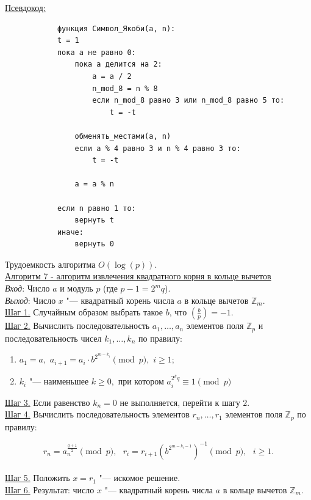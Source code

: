 \documentclass[bachelor, och, labwork]{shiza}
\begin{document}
            \underline{Псевдокод:}
            \begin{verbatim}
            функция Символ_Якоби(a, n):
            t = 1
            пока a не равно 0:
                пока a делится на 2:
                    a = a / 2
                    n_mod_8 = n % 8
                    если n_mod_8 равно 3 или n_mod_8 равно 5 то:
                        t = -t
        
                обменять_местами(a, n)
                если a % 4 равно 3 и n % 4 равно 3 то:
                    t = -t
        
                a = a % n
        
            если n равно 1 то:
                вернуть t
            иначе:
                вернуть 0
            \end{verbatim}


            Трудоемкость алгоритма $O(\log(p))$.\\

        \underline{Алгоритм 7 - алгоритм извлечения квадратного корня в кольце вычетов}\\
            \textit{Вход}: Число $a$ и модуль $p$ (где $p - 1 = 2^m q$).\\
            \textit{Выход}: Число $x$ "--- квадратный корень числа $a$ в кольце
            вычетов $\mathbb{Z}_m$.\\
            \underline{Шаг 1.} Случайным образом выбрать такое $b$, что
            $\left(\frac{b}{p}\right) = -1$.\\
            \underline{Шаг 2.} Вычислить последовательность $a_1, \dots, a_n$
            элементов поля $\mathbb{Z}_p$ и последовательность чисел $k_1,
            \dots, k_n$ по правилу:
            \begin{enumerate}
                \item $a_1 = a,$ $a_{i+1} = a_i \cdot b^{2^{m - k_i}} \pmod p,$ $i \geq 1;$
                \item $k_i$ "--- наименьшее $k \geq 0,$ при котором $a_i^{2^k q} \equiv 1 \pmod p$ 
            \end{enumerate}
            \underline{Шаг 3.} Если равенство $k_n = 0$ не выполняется, перейти
            к шагу $2$.\\
            \underline{Шаг 4.} Вычислить последовательность элементов $r_n,
            \dots, r_1$ элементов поля $\mathbb{Z}_p$ по правилу:
            
            $$r_n = a_n^{\frac{q + 1}{2}} \pmod p, \text{ } r_i = r_{i +
            1}(b^{2^{{m - k_i - 1}}})^{-1} \pmod p, \text{ } i \geq 1.$$\\
            \underline{Шаг 5.} Положить $x = r_1$ "--- искомое решение.\\
            \underline{Шаг 6.} Результат: число $x$ "--- квадратный корень
            числа $a$ в кольце вычетов $\mathbb{Z}_m$.
\end{document}
